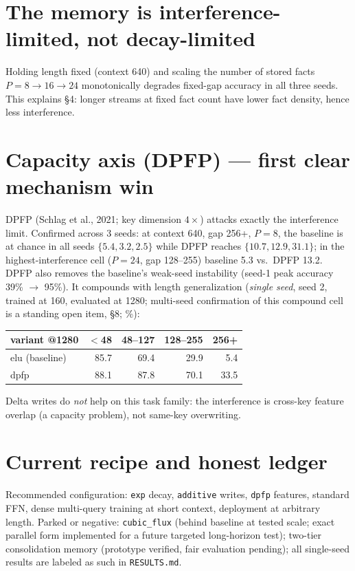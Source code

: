 \documentclass[11pt,a4paper]{article}
\newcommand{\code}[1]{\texttt{#1}}
\begin{document}
\section{The memory is interference-limited, not decay-limited}
Holding length fixed (context 640) and scaling the number of stored facts
$P = 8 \rightarrow 16 \rightarrow 24$ monotonically degrades fixed-gap accuracy
in all three seeds. This explains \S4: longer streams at fixed fact count have
lower fact density, hence less interference.

\section{Capacity axis (DPFP) --- first clear mechanism win}
DPFP (Schlag et al., 2021; key dimension $4\times$) attacks exactly the
interference limit. Confirmed across 3 seeds: at context 640, gap 256+, $P{=}8$,
the baseline is at chance in all seeds $\{5.4, 3.2, 2.5\}$ while DPFP reaches
$\{10.7, 12.9, 31.1\}$; in the highest-interference cell ($P{=}24$, gap
128--255) baseline 5.3 vs.\ DPFP 13.2. DPFP also removes the baseline's
weak-seed instability (seed-1 peak accuracy 39\% $\rightarrow$ 95\%).
It compounds with length generalization (\emph{single seed}, seed 2, trained at
160, evaluated at 1280; multi-seed confirmation of this compound cell is a
standing open item, \S8; \%):

\begin{table}[h]\centering
\begin{tabular}{lrrrr}
\toprule
variant @1280 & $<$48 & 48--127 & 128--255 & 256+ \\
\midrule
elu (baseline) & 85.7 & 69.4 & 29.9 & 5.4 \\
dpfp           & 88.1 & 87.8 & 70.1 & 33.5 \\
\bottomrule
\end{tabular}
\end{table}

\noindent
Delta writes do \emph{not} help on this task family: the interference is
cross-key feature overlap (a capacity problem), not same-key overwriting.

\section{Current recipe and honest ledger}
Recommended configuration: \code{exp} decay, \code{additive} writes,
\code{dpfp} features, standard FFN, dense multi-query training at short
context, deployment at arbitrary length. Parked or negative: \code{cubic\_flux}
(behind baseline at tested scale; exact parallel form implemented for a future
targeted long-horizon test); two-tier consolidation memory (prototype verified,
fair evaluation pending); all single-seed results are labeled as such in
\code{RESULTS.md}.
\end{document}
